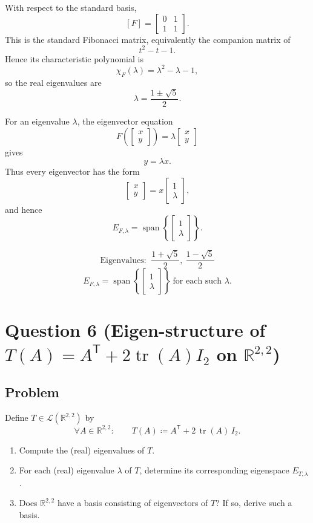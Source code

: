 \documentclass[12pt]{article}
\newcommand{\R}{\mathbb{R}}
\newcommand{\cL}{\mathcal{L}}
\newcommand{\Span}{\operatorname{span}}
\DeclareMathOperator{\tr}{tr}
\begin{document}
With respect to the standard basis,
\[
[F]=
\begin{bmatrix}
0&1\\
1&1
\end{bmatrix}.
\]
This is the standard Fibonacci matrix, equivalently the companion matrix of
\[
t^2-t-1.
\]
Hence its characteristic polynomial is
\[
\chi_F(\lambda)=\lambda^2-\lambda-1,
\]
so the real eigenvalues are
\[
\lambda=\frac{1\pm\sqrt5}{2}.
\]

For an eigenvalue $\lambda$, the eigenvector equation
\[
F\!\left(\begin{bmatrix}x\\y\end{bmatrix}\right)
=
\lambda \begin{bmatrix}x\\y\end{bmatrix}
\]
gives
\[
y=\lambda x.
\]
Thus every eigenvector has the form
\[
\begin{bmatrix}x\\y\end{bmatrix}
=
x\begin{bmatrix}1\\\lambda\end{bmatrix},
\]
and hence
\[
E_{F,\lambda}
=
\Span\left\{\begin{bmatrix}1\\\lambda\end{bmatrix}\right\}.
\]

\[
\boxed{\,\text{Eigenvalues: }\ \dfrac{1+\sqrt5}{2},\ \dfrac{1-\sqrt5}{2}\,}
\]
\[
\boxed{\,
E_{F,\lambda}
=
\Span\left\{\begin{bmatrix}1\\\lambda\end{bmatrix}\right\}
\ \text{for each such }\lambda.
\,}
\]

\newpage
\section{Question 6 (Eigen-structure of $T(A)=A^{\mathsf T}+2\tr(A)I_2$ on $\R^{2,2}$)}
\subsection{Problem}
Define $T\in \cL(\R^{2,2})$ by
\[
\forall A\in\R^{2,2}:\qquad T(A)\coloneqq A^{\mathsf T}+2\,\tr(A)\,I_2.
\]
\begin{enumerate}[label=(\alph*)]
\item Compute the (real) eigenvalues of $T$.
\item For each (real) eigenvalue $\lambda$ of $T$, determine its corresponding eigenspace $E_{T,\lambda}$.
\item Does $\R^{2,2}$ have a basis consisting of eigenvectors of $T$? If so, derive such a basis.
\end{enumerate}
\end{document}
